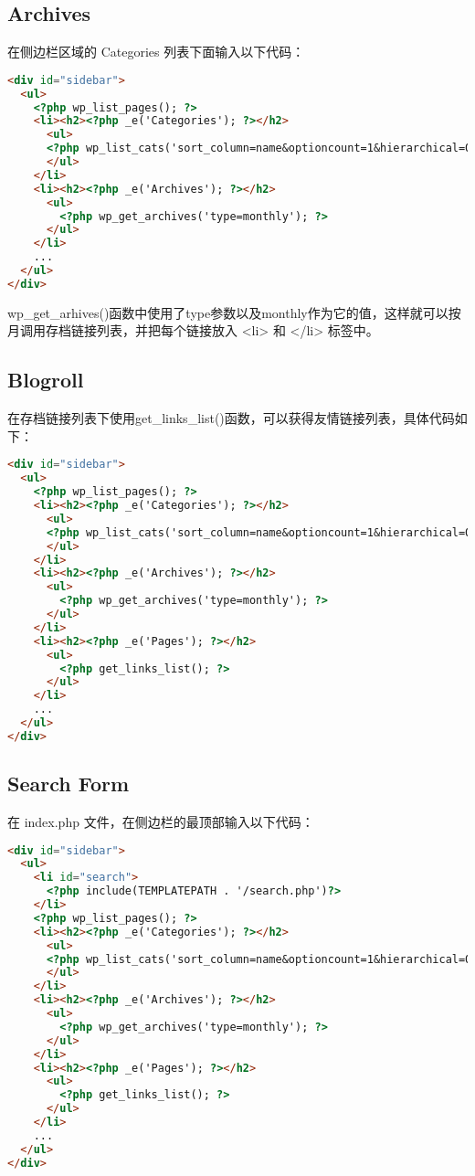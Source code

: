 \subsection{Archives}

在侧边栏区域的 Categories 列表下面输入以下代码：

\begin{lstlisting}[language=HTML]
<div id="sidebar">
  <ul>
    <?php wp_list_pages(); ?>
    <li><h2><?php _e('Categories'); ?></h2>
      <ul>
      <?php wp_list_cats('sort_column=name&optioncount=1&hierarchical=0'); ?>
      </ul>
    </li>
    <li><h2><?php _e('Archives'); ?></h2>
      <ul>
        <?php wp_get_archives('type=monthly'); ?>
      </ul>
    </li>
    ...
  </ul>
</div>
\end{lstlisting}

wp\_get\_arhives()函数中使用了type参数以及monthly作为它的值，这样就可以按月调用存档链接列表，并把每个链接放入 <li> 和 </li> 标签中。

\subsection{Blogroll}

在存档链接列表下使用get\_links\_list()函数，可以获得友情链接列表，具体代码如下：

\begin{lstlisting}[language=HTML]
<div id="sidebar">
  <ul>
    <?php wp_list_pages(); ?>
    <li><h2><?php _e('Categories'); ?></h2>
      <ul>
      <?php wp_list_cats('sort_column=name&optioncount=1&hierarchical=0'); ?>
      </ul>
    </li>
    <li><h2><?php _e('Archives'); ?></h2>
      <ul>
        <?php wp_get_archives('type=monthly'); ?>
      </ul>
    </li>
    <li><h2><?php _e('Pages'); ?></h2>
      <ul>
        <?php get_links_list(); ?>
      </ul>
    </li>
    ...
  </ul>
</div>
\end{lstlisting}


\subsection{Search Form}

在 index.php 文件，在侧边栏的最顶部输入以下代码：

\begin{lstlisting}[language=HTML]
<div id="sidebar">
  <ul>
    <li id="search">
      <?php include(TEMPLATEPATH . '/search.php')?>
    </li>
    <?php wp_list_pages(); ?>
    <li><h2><?php _e('Categories'); ?></h2>
      <ul>
      <?php wp_list_cats('sort_column=name&optioncount=1&hierarchical=0'); ?>
      </ul>
    </li>
    <li><h2><?php _e('Archives'); ?></h2>
      <ul>
        <?php wp_get_archives('type=monthly'); ?>
      </ul>
    </li>
    <li><h2><?php _e('Pages'); ?></h2>
      <ul>
        <?php get_links_list(); ?>
      </ul>
    </li>
    ...
  </ul>
</div>
\end{lstlisting}

